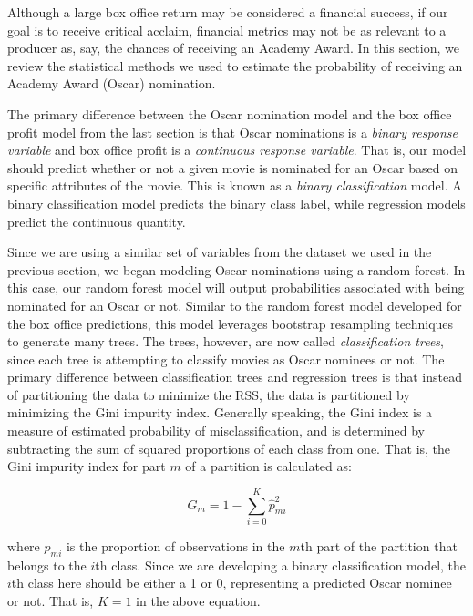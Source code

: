 \documentclass[10pt]{article}
\begin{document}
Although a large box office return may be considered a financial success, if our goal is to receive critical acclaim, financial metrics may not be as relevant to a producer as, say, the chances of receiving an Academy Award. In this section, we review the statistical methods we used to estimate the probability of receiving an Academy Award (Oscar) nomination. 

The primary difference between the Oscar nomination model and the box office profit model from the last section is that Oscar nominations is a \textit{binary response variable} and box office profit is a \textit{continuous response variable}. That is, our model should predict whether or not a given movie is nominated for an Oscar based on specific attributes of the movie. This is known as a \textit{binary classification} model. A binary classification model predicts the binary class label, while regression models predict the continuous quantity.

Since we are using a similar set of variables from the dataset we used in the previous section, we began modeling Oscar nominations using a random forest. In this case, our random forest model will output probabilities associated with being nominated for an Oscar or not. Similar to the random forest model developed for the box office predictions, this model leverages bootstrap resampling techniques to generate many trees. The trees, however, are now called \textit{classification trees}, since each tree is attempting to classify movies as Oscar nominees or not. The primary difference between classification trees and regression trees is that instead of partitioning the data to minimize the RSS, the data is partitioned by minimizing the Gini impurity index. Generally speaking, the Gini index is a measure of estimated probability of misclassification, and is determined by subtracting the sum of squared proportions of each class from one. That is, the Gini impurity index for part $m$ of a partition is calculated as:

$$G_{m} = 1-\sum_{i=0}^{K} \hat{p}_{m i}^{2}$$

where $\hat{p}_{m i}$ is the proportion of observations in the $m$th part of the partition that belongs to the $i$th class. Since we are developing a binary classification model, the $i$th class here should be either a 1 or 0, representing a predicted Oscar nominee or not. That is, $K=1$ in the above equation. 
\end{document}
